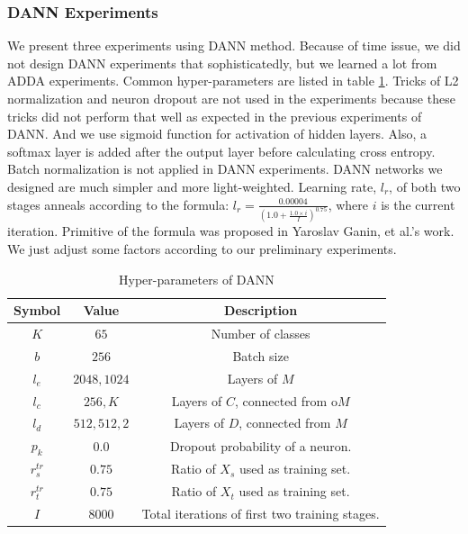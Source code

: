 \documentclass[conference]{IEEEtran}
\begin{document}
\subsubsection{DANN Experiments}
We present three experiments using DANN method. Because of time issue, we did not design DANN experiments that sophisticatedly, but we learned a lot from ADDA experiments. Common hyper-parameters are listed in table \ref{tab:SymDANN}. Tricks of L2 normalization and neuron dropout are not used in the experiments because these tricks did not perform that well as expected in the previous experiments of DANN. And we use sigmoid function for activation of hidden layers. Also, a softmax layer is added after the output layer before calculating cross entropy. Batch normalization is not applied in DANN experiments. DANN networks we designed are much simpler and more light-weighted. Learning rate, $l_r$, of both two stages anneals according to the formula: $l_r= \frac{0.00004}{ (1.0 + \frac{1.0 \times i}{I})^{0.75}}$, where $i$ is the current iteration. Primitive of the formula was proposed in Yaroslav Ganin, et al.'s work. We just adjust some factors according to our preliminary experiments.
 \begin{table}[h]
	\centering
	\caption{Hyper-parameters of DANN}
	\label{tab:SymDANN}
	\begin{tabular}{ccc}
		\hline
		Symbol & Value & Description \\
		\hline
		\hline
        $K$ & $65$ & Number of classes \\
		$b$ & $256$ & Batch size \\
		$l_e$ & ${2048,1024}$ & Layers of $M$ \\
		$l_c$ & ${256,K}$ & Layers of $C$, connected from o$M$  \\
		$l_d$ & ${512,512,2}$ & Layers of $D$, connected from $M$ \\
        $p_k$ & $0.0$ & Dropout probability of a neuron. \\
        $r^{tr}_{s}$ & $0.75$ & Ratio of $X_s$ used as training set.\\
        $r^{tr}_{t}$ & $0.75$ & Ratio of $X_t$ used as training set.  \\
        $I$ & $8000$ & Total iterations of first two training stages.   \\
		\hline
	\end{tabular}
\end{table}
\end{document}
